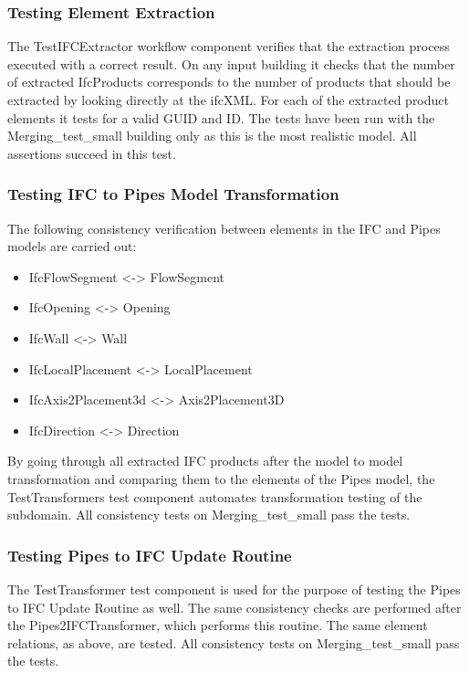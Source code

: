 \subsubsection{Testing Element Extraction}
The TestIFCExtractor workflow component verifies that the extraction process executed with a correct result. On any input building it checks that the number of extracted IfcProducts corresponds to the number of products that should be extracted by looking directly at the ifcXML. For each of the extracted product elements it tests for a valid GUID and ID. The tests have been run with the Merging\_{}test\_{}small building only as this is the most realistic model. All assertions succeed in this test.

\subsubsection{Testing IFC to Pipes Model Transformation}
The following consistency verification between elements in the IFC and Pipes models are carried out:

\begin{itemize}
	\item IfcFlowSegment <-> FlowSegment
	\item IfcOpening <-> Opening
	\item IfcWall <-> Wall
	\item IfcLocalPlacement <-> LocalPlacement
	\item IfcAxis2Placement3d <-> Axis2Placement3D
	\item IfcDirection <-> Direction
\end{itemize}

By going through all extracted IFC products after the model to model transformation and comparing them to the elements of the Pipes model, the TestTransformers test component automates transformation testing of the subdomain. All consistency tests on Merging\_{}test\_{}small pass the tests.

\subsubsection{Testing Pipes to IFC Update Routine}
The TestTransformer test component is used for the purpose of testing the Pipes to IFC Update Routine as well. The same consistency checks are performed after the Pipes2IFCTransformer, which performs this routine. The same element relations, as above, are tested. All consistency tests on Merging\_{}test\_{}small pass the tests.





